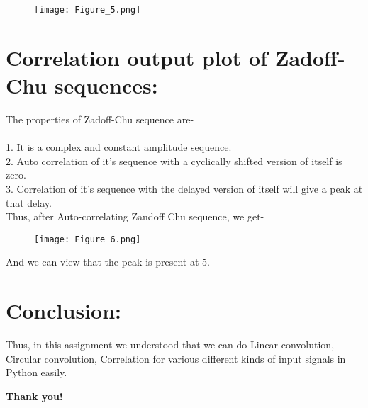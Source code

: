 \documentclass[12pt]{article}
\begin{document}
\begin{figure}[h!]
\centering
\texttt{[image: Figure\_5.png]}
\label{fig:exemplo}
\end{figure}
 
\newpage
\section*{Correlation output plot of Zadoff-Chu sequences:}

The properties of Zadoff-Chu sequence are-\\\\
1. It is a complex and constant amplitude sequence.\\
2. Auto correlation of it's sequence with a cyclically shifted version of itself is zero.\\
3. Correlation of it's sequence with the delayed version of itself will give a peak at that delay.\\

Thus, after Auto-correlating Zandoff Chu sequence, we get-

\begin{figure}[h!]
\centering
\texttt{[image: Figure\_6.png]}
\label{fig:exemplo}
\end{figure}
And we can view that the peak is present at 5.

\section*{Conclusion:}
Thus, in this assignment we understood that we can do Linear convolution, Circular convolution, Correlation for various different kinds of input signals in Python easily. 
\begin{center} 
\textbf{Thank you!}
\end{center} 
\end{document}

